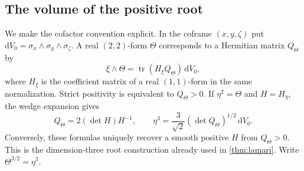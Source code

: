 \subsection{The volume of the positive root}

We make the cofactor convention explicit. In the coframe $(x,y,\zeta)$ put
$\mathrm{d}V_0=\sigma_x\wedge\sigma_y\wedge\sigma_\zeta$. A real $(2,2)$-form $\Theta$ corresponds to a Hermitian matrix $Q_\Theta$ by
\[
 \xi\wedge\Theta=\operatorname{tr}(H_\xi Q_\Theta)\,\mathrm{d}V_0,
\]
where $H_\xi$ is the coefficient matrix of a real $(1,1)$-form in the same normalization. Strict positivity is equivalent to $Q_\Theta>0$. If $\eta^2=\Theta$ and $H=H_\eta$, the wedge expansion gives
\[
 Q_\Theta=2(\det H)H^{-1},\qquad
 \eta^3=\frac{3}{\sqrt2}(\det Q_\Theta)^{1/2}\,\mathrm{d}V_0.
\]
Conversely, these formulas uniquely recover a smooth positive $H$ from $Q_\Theta>0$. This is the dimension-three root construction already used in \cref{thm:lamari}. Write $\Theta^{3/2}=\eta^3$.

